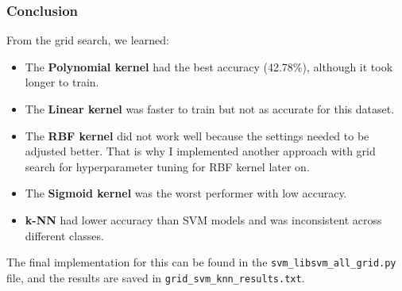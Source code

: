 \documentclass[lettersize,journal]{IEEEtran}
\begin{document}
\subsubsection{\textbf{Conclusion}} 
From the grid search, we learned:
\vspace{-1.7cm}
\begin{itemize}
    \item The \textbf{Polynomial kernel} had the best accuracy (42.78\%), although it took longer to train.
    \item The \textbf{Linear kernel} was faster to train but not as accurate for this dataset.
    \item The \textbf{RBF kernel} did not work well because the settings needed to be adjusted better. That is why I implemented another approach with grid search for hyperparameter tuning for RBF kernel later on.
    \item The \textbf{Sigmoid kernel} was the worst performer with low accuracy.
    \item \textbf{k-NN} had lower accuracy than SVM models and was inconsistent across different classes.
\end{itemize}

The final implementation for this can be found in the \texttt{svm\_libsvm\_all\_grid.py} file, and the results are saved in \texttt{grid\_svm\_knn\_results.txt}.

\vspace{0.5cm}
\end{document}

